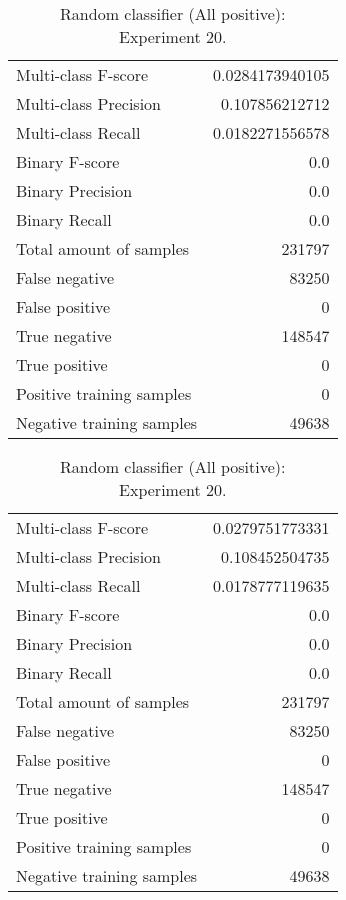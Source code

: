 \begin{table}[H]
\begin{minipage}{0.5\textwidth}
\caption{Random classifier (All positive): \\Experiment 19.}
\centering
\begin{tabular}{l r}
\toprule
Multi-class F-score & 0.0284173940105 \\
Multi-class Precision & 0.107856212712 \\
Multi-class Recall & 0.0182271556578 \\
\midrule
Binary F-score & 0.0 \\
Binary Precision & 0.0 \\
Binary Recall & 0.0 \\
\midrule
Total amount of samples & 231797 \\
False negative & 83250 \\
False positive & 0 \\
True negative & 148547 \\
True positive & 0 \\
\midrule
Positive training samples & 0 \\
Negative training samples & 49638 \\
\bottomrule
\end{tabular}
\end{minipage}
\hfillx
\begin{minipage}{0.5\textwidth}
\caption{Random classifier (All positive): \\Experiment 20.}
\centering
\begin{tabular}{l r}
\toprule
Multi-class F-score & 0.0279751773331 \\
Multi-class Precision & 0.108452504735 \\
Multi-class Recall & 0.0178777119635 \\
\midrule
Binary F-score & 0.0 \\
Binary Precision & 0.0 \\
Binary Recall & 0.0 \\
\midrule
Total amount of samples & 231797 \\
False negative & 83250 \\
False positive & 0 \\
True negative & 148547 \\
True positive & 0 \\
\midrule
Positive training samples & 0 \\
Negative training samples & 49638 \\
\bottomrule
\end{tabular}
\end{minipage}
\end{table}
